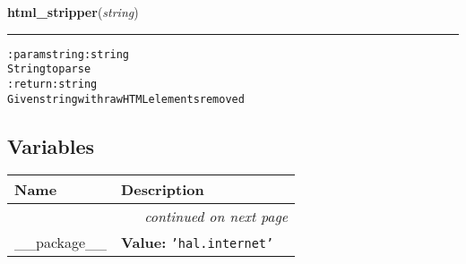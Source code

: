     \label{hal:internet:parser:html_stripper}

    \vspace{0.5ex}

\hspace{.8\funcindent}\begin{boxedminipage}{\funcwidth}

    \raggedright \textbf{html\_stripper}(\textit{string})

    \vspace{-1.5ex}

    \rule{\textwidth}{0.5\fboxrule}
\setlength{\parskip}{2ex}
\begin{alltt}

:param string: string
    String to parse
:return: string
    Given string with raw HTML elements removed
\end{alltt}

\setlength{\parskip}{1ex}
    \end{boxedminipage}



  \subsection{Variables}

    \vspace{-1cm}
\hspace{\varindent}\begin{longtable}{|p{\varnamewidth}|p{\vardescrwidth}|l}
\cline{1-2}
\cline{1-2} \centering \textbf{Name} & \centering \textbf{Description}& \\
\cline{1-2}
\endhead\cline{1-2}\multicolumn{3}{r}{\small\textit{continued on next page}}\\\endfoot\cline{1-2}
\endlastfoot\raggedright \_\-\_\-p\-a\-c\-k\-a\-g\-e\-\_\-\_\- & \raggedright \textbf{Value:} 
{\tt \texttt{'}\texttt{hal.internet}\texttt{'}}&\\
\cline{1-2}
\end{longtable}



